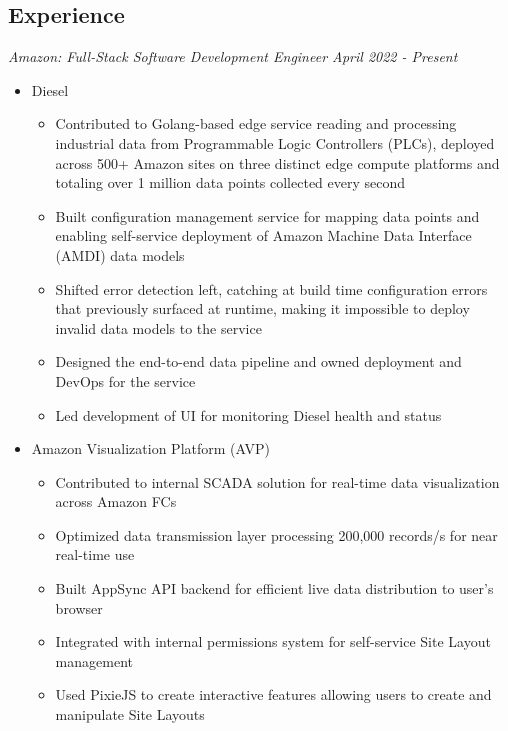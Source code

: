 \documentclass[line,overlapped]{res}
\begin{document}
\setlength\itemsep{.25em}
\address{Email: kllinzy1@gmail.com \hfill Mobile: (918) 440-3563}

\begin{resume}
  \section{Experience}
  {\sl Amazon: Full-Stack Software Development Engineer \hfill April 2022 - Present} 
    \begin{itemize}[leftmargin=*]
      \item[] Diesel
      \begin{itemize}
        \setlength\itemsep{.1em}
        \item Contributed to Golang-based edge service reading and processing industrial data from Programmable Logic Controllers (PLCs), deployed across 500+ Amazon sites on three distinct edge compute platforms and totaling over 1 million data points collected every second
        \item Built configuration management service for mapping data points and enabling self-service deployment of Amazon Machine Data Interface (AMDI) data models
        \item Shifted error detection left, catching at build time configuration errors that previously surfaced at runtime, making it impossible to deploy invalid data models to the service
        \item Designed the end-to-end data pipeline and owned deployment and DevOps for the service
        \item Led development of UI for monitoring Diesel health and status
      \end{itemize} \item[] Amazon Visualization Platform (AVP)
      \begin{itemize}
        \setlength\itemsep{.1em}
        \item Contributed to internal SCADA solution for real-time data visualization across Amazon FCs
        \item Optimized data transmission layer processing 200,000 records/s for near real-time use
        \item Built AppSync API backend for efficient live data distribution to user's browser
        \item Integrated with internal permissions system for self-service Site Layout management
        \item Used PixieJS to create interactive features allowing users to create and manipulate Site Layouts
      \end{itemize}
    \end{itemize}


\end{resume}
\end{document}
